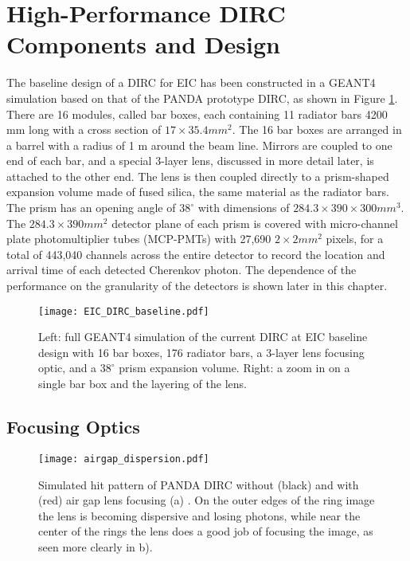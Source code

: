\section{High-Performance DIRC Components and Design}
The baseline design of a DIRC for EIC has been constructed in a GEANT4 simulation based on that of the PANDA prototype DIRC, as shown in Figure \ref{fig:baseline_design}. There are 16 modules, called bar boxes, each containing 11 radiator bars 4200 mm long with a cross section of $17\times35.4\unit{mm}^2$. The 16 bar boxes are arranged in a barrel with a radius of 1 m around the beam line. Mirrors are coupled to one end of each bar, and a special 3-layer lens, discussed in more detail later, is attached to the other end. The lens is then coupled directly to a prism-shaped expansion volume made of fused silica, the same material as the radiator bars. The prism has an opening angle of $38^\circ$ with dimensions of $284.3\times390\times300\unit{mm}^3$. The $284.3\times390\unit{mm}^2$ detector plane of each prism is covered with micro-channel plate photomultiplier tubes (MCP-PMTs) with 27,690 $2\times2\unit{mm}^2$ pixels, for a total of 443,040 channels across the entire detector to record the location and arrival time of each detected Cherenkov photon. The dependence of the performance on the granularity of the detectors is shown later in this chapter.

\begin{figure}[!htb]
	\centering
	\texttt{[image: EIC\_DIRC\_baseline.pdf]}
	\caption{Left: full GEANT4 simulation of the current DIRC at EIC baseline design with 16 bar boxes, 176 radiator bars, a 3-layer lens focusing optic, and a $38^\circ$ prism expansion volume. Right: a zoom in on a single bar box and the layering of the lens.}
	\label{fig:baseline_design}
\end{figure}

\subsection{Focusing Optics}

\begin{figure}[!htb]
	\centering
	\texttt{[image: airgap\_dispersion.pdf]}
	\caption[Simulated hit pattern of PANDA DIRC without (black) and with (red) air gap lens focusing (a). On the outer edges of the ring image the lens is becoming dispersive  and losing photons, while near the center of the rings the lens does a good job of focusing the image, as seen more clearly in b).]{Simulated hit pattern of PANDA DIRC without (black) and with (red) air gap lens focusing (a) \cite{GregThesis}. On the outer edges of the ring image the lens is becoming dispersive  and losing photons, while near the center of the rings the lens does a good job of focusing the image, as seen more clearly in b).}
	\label{fig:airgap_dispersion}
\end{figure}

